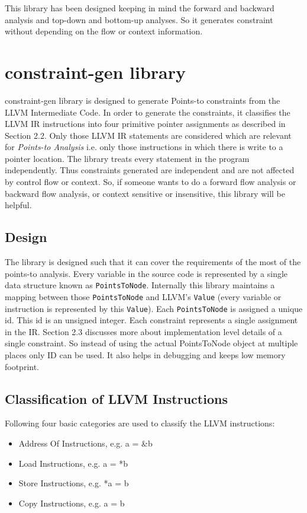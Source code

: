 \documentclass[a4paper,12pt]{report}
\begin{document}
This library has been designed keeping in mind the forward and backward
analysis and top-down and bottom-up analyses. So it generates constraint
without depending on the flow or context information.

\chapter{constraint-gen library}

constraint-gen library is designed to generate Points-to constraints from the
LLVM Intermediate Code. In order to generate the constraints, it classifies the
LLVM IR instructions into four primitive pointer assignments as described 
in Section 2.2. Only those LLVM IR statements are considered which are
relevant for \textit{Points-to Analysis} i.e. only those instructions in which 
there is write to a pointer location. The library treats every statement in the
program independently. Thus constraints generated are independent and are not 
affected by control flow or context. So, if someone wants to do a 
forward flow analysis or backward flow analysis, or context sensitive or 
insensitive, this library will be helpful.

\section{Design}
The library is designed such that it can cover the requirements of the most of the
points-to analysis. Every variable in the source code is represented by a single data
structure known as \texttt{PointsToNode}. Internally this library maintains a mapping 
between those \texttt{PointsToNode} and LLVM's \texttt{Value} (every variable or instruction is 
represented by this \texttt{Value}). Each \texttt{PointsToNode} is assigned a unique id. This 
id is an unsigned integer. Each constraint represents a single assignment in 
the IR. Section 2.3 discusses more about implementation level details 
of a single constraint. So instead of using the actual PointsToNode object at
multiple places only ID can be used. It also helps in debugging and keeps low
memory footprint.

\section{Classification of LLVM Instructions}
Following four basic categories are used to classify the LLVM instructions:

\begin{itemize}
    \item Address Of Instructions, e.g. a = \&b
    \item Load Instructions, e.g.  a = *b
    \item Store Instructions, e.g. *a = b
    \item Copy Instructions, e.g. a = b
\end{itemize}
\end{document}
